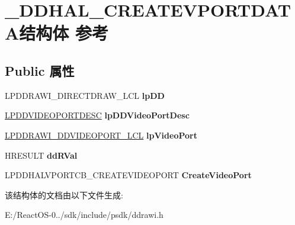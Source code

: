 \hypertarget{struct___d_d_h_a_l___c_r_e_a_t_e_v_p_o_r_t_d_a_t_a}{}\section{\+\_\+\+D\+D\+H\+A\+L\+\_\+\+C\+R\+E\+A\+T\+E\+V\+P\+O\+R\+T\+D\+A\+T\+A结构体 参考}
\label{struct___d_d_h_a_l___c_r_e_a_t_e_v_p_o_r_t_d_a_t_a}
\subsection*{Public 属性}
\begin{DoxyCompactItemize}
\item 
\mbox{\label{struct___d_d_h_a_l___c_r_e_a_t_e_v_p_o_r_t_d_a_t_a_a844683000ec04ae5ced1dbb436020e4c}} 
L\+P\+D\+D\+R\+A\+W\+I\+\_\+\+D\+I\+R\+E\+C\+T\+D\+R\+A\+W\+\_\+\+L\+CL {\bfseries lp\+DD}
\item 
\mbox{\label{struct___d_d_h_a_l___c_r_e_a_t_e_v_p_o_r_t_d_a_t_a_adc3f69e6d4fa3e63ad836a0c49ea638e}} 
\hyperlink{struct___d_d_v_i_d_e_o_p_o_r_t_d_e_s_c}{L\+P\+D\+D\+V\+I\+D\+E\+O\+P\+O\+R\+T\+D\+E\+SC} {\bfseries lp\+D\+D\+Video\+Port\+Desc}
\item 
\mbox{\label{struct___d_d_h_a_l___c_r_e_a_t_e_v_p_o_r_t_d_a_t_a_aac961a43f1469dacd27fcf219fccd160}} 
\hyperlink{struct___d_d_r_a_w_i___d_d_v_i_d_e_o_p_o_r_t___l_c_l}{L\+P\+D\+D\+R\+A\+W\+I\+\_\+\+D\+D\+V\+I\+D\+E\+O\+P\+O\+R\+T\+\_\+\+L\+CL} {\bfseries lp\+Video\+Port}
\item 
\mbox{\label{struct___d_d_h_a_l___c_r_e_a_t_e_v_p_o_r_t_d_a_t_a_ad6bb7b641aabf2d9d5b1062641fed5c4}} 
H\+R\+E\+S\+U\+LT {\bfseries dd\+R\+Val}
\item 
\mbox{\label{struct___d_d_h_a_l___c_r_e_a_t_e_v_p_o_r_t_d_a_t_a_a2abb395d7e0b588de7a065753090e9b2}} 
L\+P\+D\+D\+H\+A\+L\+V\+P\+O\+R\+T\+C\+B\+\_\+\+C\+R\+E\+A\+T\+E\+V\+I\+D\+E\+O\+P\+O\+RT {\bfseries Create\+Video\+Port}
\end{DoxyCompactItemize}


该结构体的文档由以下文件生成\+:\begin{DoxyCompactItemize}
\item 
E\+:/\+React\+O\+S-\/0../sdk/include/psdk/ddrawi.\+h\end{DoxyCompactItemize}
